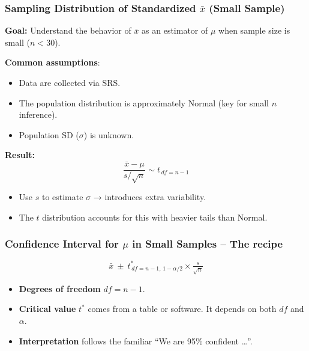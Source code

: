 \documentclass[handout]{beamer}
\begin{document}
\begin{frame}
\frametitle{Sampling Distribution of Standardized $\bar{x}$ (Small Sample)}

\textbf{Goal:} Understand the behavior of $\bar{x}$ as an estimator of $\mu$ when sample size is small ($n < 30$).

\vspace{0.5em}
\textbf{Common assumptions}:
\begin{itemize}
  \item Data are collected via SRS.
  \item The population distribution is approximately Normal (key for small $n$ inference).
  \item Population SD ($\sigma$) is unknown.
\end{itemize}

\vspace{0.5em}
\textbf{Result:}
\[
\frac{\bar{x}-\mu}{s/\sqrt{n}}
 \sim t_{\,df=n-1}
\]
\vspace{-0.5em}
\begin{itemize}
  \item Use $s$ to estimate $\sigma$ → introduces extra variability.
  \item The $t$ distribution accounts for this with heavier tails than Normal.
\end{itemize}

\end{frame}


\begin{frame}
\frametitle{Confidence Interval for $\mu$ in Small Samples -- The recipe}
\[
\boxed{\;
\bar{x} \ \pm\ t^{\ast}_{\,df=n-1,\,1-\alpha/2} \times
        \tfrac{s}{\sqrt n}
\;}
\]
\begin{itemize}
  \item \textbf{Degrees of freedom} \(df=n-1\).
  \item \textbf{Critical value} \(t^{\ast}\) comes from a table or software.  It depends on both $df$ and $\alpha$.
  \item \textbf{Interpretation} follows the familiar “We are 95\% confident …”.
\end{itemize}
\end{frame}
\end{document}
